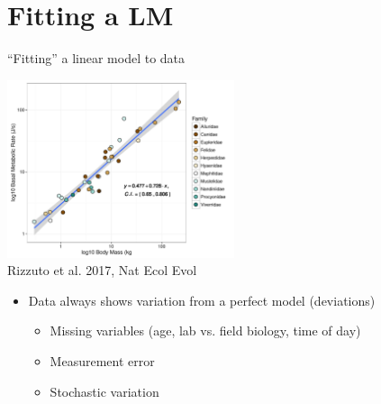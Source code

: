 \documentclass[xcolor=x11names,handout,compress]{beamer}
\renewcommand{\(}{\begin{columns}}
\renewcommand{\)}{\end{columns}}
\newcommand{\<}[1]{\begin{column}{#1}}
\renewcommand{\>}{\end{column}}
\begin{document}
\section{Fitting a LM}


\begin{frame}{``Fitting'' a linear model to data}


 \begin{center}
            \includegraphics[width=0.5\textwidth]{CarnivoreBMRplot.pdf}\\
            \vspace{-6pt}
            {\tiny Rizzuto et al. 2017, Nat Ecol Evol}
\end{center}		
\begin{itemize}\itemsep6pt
    \item Data always shows variation from a perfect model (deviations)
    \begin{itemize}[<+->]
    \item Missing variables (age, lab vs. field biology, time of day) 
    \item Measurement error 
    \item Stochastic variation
    \end{itemize}
    \end{itemize}

\end{frame}
    
\end{document}
